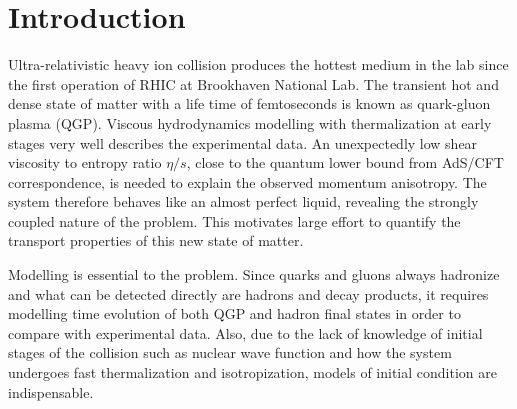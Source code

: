 \documentclass[aps,prl,twocolumn,groupedaddress]{revtex4-1}
\begin{document}
\section{Introduction}
	Ultra-relativistic heavy ion collision produces the hottest medium in the lab since the first operation of RHIC at Brookhaven National Lab. 
	The transient hot and dense state of matter with a life time of femtoseconds is known as quark-gluon plasma (QGP). 
	Viscous hydrodynamics modelling with thermalization at early stages very well describes the experimental data. 
	An unexpectedly low shear viscosity to entropy ratio $\eta/s$, close to the quantum lower bound from AdS/CFT correspondence, is needed to explain the observed momentum anisotropy.
	The system therefore behaves like an almost perfect liquid, revealing the strongly coupled nature of the problem.
	This motivates large effort to quantify the transport properties of this new state of matter.
	
	Modelling is essential to the problem. 
	Since quarks and gluons always hadronize and what can be detected directly are hadrons and decay products, it requires modelling time evolution of both QGP and hadron final states in order to compare with experimental data. 
	Also, due to the lack of knowledge of initial stages of the collision such as nuclear wave function and how the system undergoes fast thermalization and isotropization, models of initial condition are indispensable.
	
\end{document}
